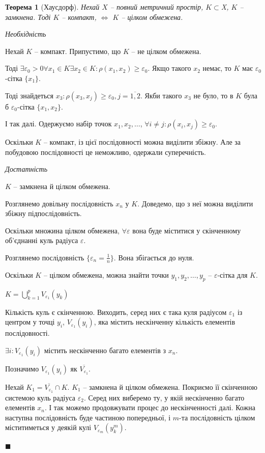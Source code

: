 \documentclass[14pt,twoside]{extreport}
\theoremstyle{mystyle}
\newtheorem{thm}{Теорема}
\renewenvironment{proof}{{\bfseries Доведення.}}{$\blacksquare$}
\numberwithin{equation}{chapter}
\begin{document}
\begin{thm}[Хаусдорф]
	Нехай $X $ -- повний метричний простір, $K \subset $X$ $, $K$ -- замкнена. Тоді $K$ -- компакт, $\iff $ $K$ -- цілком обмежена.
\end{thm}
\begin{proof}
	
	\emph{Необхідність}
	
	Нехай $K$ -- компакт.
	Припустимо, що $K $ -- не цілком обмежена.
	
	Тоді $\exists \varepsilon_0 > 0 \forall x_1 \in K \exists x_2 \in K:  \rho(x_1, x_2) \ge \varepsilon_0 $. Якщо такого $x_2$ немає, то $K$ має $\varepsilon_0 $-сітка $\{x_1\}$.
	
	Тоді знайдеться $x_3: \rho(x_3, x_j) \ge \varepsilon_0, j = \overline{1, 2} $. Якби такого $x_3 $ не було, то в $K$ була б $\varepsilon_0$-сітка $\{x_1, x_2\} $.
	
	І так далі. Одержуємо набір точок $x_1, x_2, \ldots $, $\forall i \ne j:  \rho(x_i, x_j) \geqslant \varepsilon_0 $.
	
	Оскільки $K$ -- компакт, із цієї послідовності можна виділити збіжну. Але за побудовою послідовності це неможливо, одержали суперечність.
	
	\emph{Достатність}
	
	$K$ -- замкнена й цілком обмежена.
	
	Розглянемо довільну послідовність $x_n$ у $K$. Доведемо, що з неї можна виділити збіжну підпослідовність.
	
	Оскільки множина цілком обмежена, $\forall \varepsilon$ вона буде міститися у скінченному об'єднанні куль радіуса $\varepsilon$.
	
	Розглянемо послідовність $\{\varepsilon_n = \frac 1 n \}$. Вона збігається до нуля.
	
	Оскільки $K$ -- цілком обмежена, можна знайти точки $y_1, y_2, \ldots, y_p $ -- $\varepsilon$-сітка для $K$.
	
	$K = \bigcup\limits_{k = 1}^{p} V_{\varepsilon_1}(y_k)$
	
	Кількість куль є скінченною. Виходить, серед них є така куля радіусом $\varepsilon_1$ із центром у точці $y_i$, $V_{\varepsilon_1}(y_i)$, яка містить нескінченну кількість елементів послідовності.
	
	$\exists i: V_{\varepsilon_1}(y_i)$ містить нескінченно багато елементів з $x_n$.
	
	Позначимо $V_{\varepsilon_1}(y_i) $ як $\overline{V_{\varepsilon_1}} $.
	
	Нехай $K_1 = \overline{V_{\varepsilon_1}} \cap K$. $K_1$ -- замкнена й цілком обмежена. Покриємо її скінченною системою куль радіуса $\varepsilon_2$. Серед них виберемо ту, у якій нескінченно багато елементів $x_n$. І так можемо продовжувати процес до нескінченності далі. Кожна наступна послідовність буде частиною попередньої, і $m$-та послідовність цілком міститиметься у деякій кулі $V_{\varepsilon_m}(y_k^m)$.
	

\end{proof}
\end{document}
